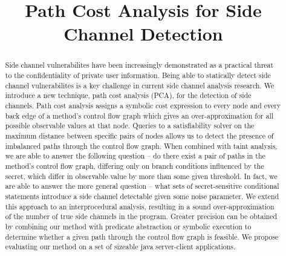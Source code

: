 \documentclass[sigconf]{acmart}
\begin{document}
\newcommand\todo[1]{\textcolor{red}{#1}}

\title{Path Cost Analysis for Side Channel Detection}


\begin{abstract}
Side channel vulnerabilites have been increasingly demonstrated as a practical threat to the confidentiality of private user information. Being able to statically detect side channel vulnerabilites is a key challenge in current side channel analysis research. We introduce a new technique, path cost analysis (PCA), for the detection of side channels. Path cost analysis assigns a symbolic cost expression to every node and every back edge of a method's control flow graph which gives an over-approximation for all possible observable values at that node. Queries to a satisfiability solver on the maximum distance between specific pairs of nodes allows us to detect the presence of imbalanced paths through the control flow graph. When combined with taint analysis, we are able to answer the following question -- do there exist a pair of paths in the method's control flow graph, differing only on branch conditions influenced by the secret, which differ in observable value by more than some given threshold. In fact, we are able to answer the more general question -- what sets of secret-sensitive conditional statements introduce a side channel detectable given some noise parameter. We extend this approach to an interprocedural analysis, resulting in a sound over-approximation of the number of true side channels in the program. Greater precision can be obtained by combining our method with predicate abstraction or symbolic execution to determine whether a given path through the control flow graph is feasible. We propose evaluating our method on a set of sizeable java server-client applications. 
\end{abstract}



\maketitle





%

\end{document}
